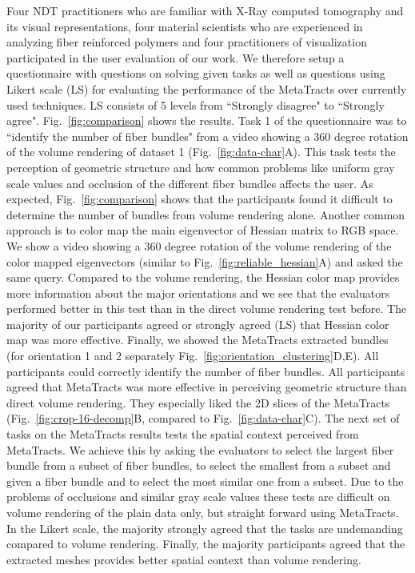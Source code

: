 Four NDT practitioners who are familiar with X-Ray computed tomography and its visual representations, four material scientists who are experienced in analyzing fiber reinforced polymers and four practitioners of visualization participated in the user evaluation of our work. We therefore setup a questionnaire with questions on solving given tasks as well as questions using Likert scale (LS) for evaluating the performance of the MetaTracts over currently used techniques. LS consists of 5 levels from ``Strongly disagree" to ``Strongly agree". Fig.~\ref{fig:comparison} shows the results. Task 1 of the questionnaire was to ``identify the number of fiber bundles" from a video showing a 360 degree rotation of the volume rendering of dataset 1 (Fig.~\ref{fig:data-char}A). This task tests the perception of geometric structure and how common problems like uniform gray scale values and occlusion of the different fiber bundles affects the user. As expected, Fig.~\ref{fig:comparison} shows that the participants found it difficult to determine the number of bundles from volume rendering alone. Another common approach is to color map the main eigenvector of Hessian matrix to RGB space. We show a video showing a 360 degree rotation of the volume rendering of the color mapped eigenvectors (similar to Fig.~\ref{fig:reliable_hessian}A) and asked the same query. Compared to the volume rendering, the Hessian color map provides more information about the major orientations and we see that the evaluators performed better in this test than in the direct volume rendering test before. The majority of our participants agreed or strongly agreed (LS) that Hessian color map was more effective. Finally, we showed the MetaTracts extracted bundles (for orientation 1 and 2 separately Fig.~\ref{fig:orientation_clustering}D,E). All participants could correctly identify the number of fiber bundles. All participants agreed that MetaTracts was more effective in perceiving geometric structure than direct volume rendering. They especially liked the 2D slices of the MetaTracts (Fig.~\ref{fig:crop-16-decomp}B, compared to Fig.~\ref{fig:data-char}C).
The next set of tasks on the MetaTracts results tests the spatial context perceived from MetaTracts. We achieve this by asking the evaluators to select the largest fiber bundle from a subset of fiber bundles, to select the smallest from a subset and given a fiber bundle and to select the most similar one from a subset. Due to the problems of occlusions and similar gray scale values these tests are difficult on volume rendering of the plain data only, but straight forward using MetaTracts. In the Likert scale, the majority strongly agreed that the tasks are undemanding compared to volume rendering.
Finally, the majority participants agreed that the extracted meshes provides better spatial context than volume rendering. 
 
